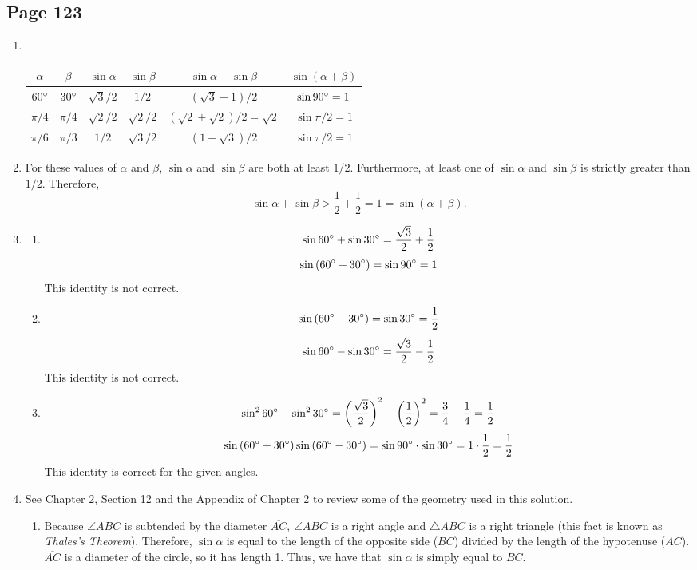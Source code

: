 \documentclass{article}
\newenvironment{solutions}[1]
{\subsection*{#1}
 \begin{enumerate}[leftmargin=1.5em]}
{\end{enumerate}}
\newcommand{\solution}{\item}
\newenvironment{subsolutions}
{\begin{enumerate}}
{\end{enumerate}}
\newcommand{\subsolution}{\item}
\begin{document}
\begin{solutions}{Page 123}
\solution ~ %
\begin{center}
\bgroup
\def\arraystretch{2.1}
\setlength\tabcolsep{15pt}
\begin{tabular}{ |c|c|c|c|c|c| }
\hline
$\alpha$
& $\beta$
& $\sin{\alpha}$
& $\sin{\beta}$
& $\sin{\alpha} + \sin{\beta}$
& $\sin\left(\alpha+\beta\right)$ \\
\hline
$60\degree$
& $30\degree$
& $\sqrt{3}/2$
& $1/2$
& $\left(\sqrt{3}+1\right)/2$
& $\sin{90\degree} = 1$\\
\hline
$\pi / 4$
& $\pi / 4$
& $\sqrt{2}/2$
& $\sqrt{2}/2$
& $\left(\sqrt{2}+\sqrt{2}\right)/2 = \sqrt{2}$
& $\sin{\pi/2} = 1$\\
\hline
$\pi / 6$
& $\pi / 3$
& $1/2$
& $\sqrt{3}/2$
& $\left(1+\sqrt{3}\right)/2$
& $\sin{\pi/2} = 1$\\
\hline
\end{tabular}
\egroup
\end{center}

\solution %
For these values of $\alpha$ and $\beta$, $\sin{\alpha}$ and $\sin{\beta}$ are both at least $1/2$. Furthermore, at least one of $\sin{\alpha}$ and $\sin{\beta}$ is strictly greater than $1/2$. Therefore,
\[
\sin{\alpha} + \sin{\beta} > \dfrac{1}{2} + \dfrac{1}{2} = 1 = \sin\left(\alpha+\beta\right).
\]
\solution %
\begin{subsolutions}

\subsolution %
\[
\sin{60\degree} + \sin{30\degree} = \dfrac{\sqrt{3}}{2} + \dfrac{1}{2}
\]
\[
\sin\left(60\degree + 30\degree\right) = \sin{90\degree} = 1
\]
This identity is not correct.
\subsolution %
\[
\sin\left(60\degree - 30\degree\right) = \sin{30\degree} = \dfrac{1}{2}
\]
\[
\sin{60\degree} - \sin{30\degree} = \dfrac{\sqrt{3}}{2} - \dfrac{1}{2}
\]
This identity is not correct.
\subsolution %
\[
\sin^{2}{60\degree} - \sin^2{30\degree} = \left(\dfrac{\sqrt{3}}{2}\right)^2 - \left(\dfrac{1}{2}\right)^2 = \dfrac{3}{4} - \dfrac{1}{4} = \dfrac{1}{2}
\]
\[
\sin\left(60\degree + 30\degree\right)\sin\left(60\degree - 30\degree\right) = \sin{90\degree} \cdot \sin{30\degree} = 1 \cdot \dfrac{1}{2} = \dfrac{1}{2}
\]
This identity is correct for the given angles.

\end{subsolutions}

\solution %
See Chapter 2, Section 12 and the Appendix of Chapter 2 to review some of the geometry used in this solution.
\begin{subsolutions}
\subsolution %
Because $\angle{ABC}$ is subtended by the diameter $\overline{AC}$, $\angle{ABC}$ is a right angle and $\triangle{ABC}$ is a right triangle (this fact is known as \textit{Thales's Theorem}). Therefore, $\sin{\alpha}$ is equal to the length of the opposite side ($BC$) divided by the length of the hypotenuse ($AC$). $\overline{AC}$ is a diameter of the circle, so it has length 1. Thus, we have that $\sin{\alpha}$ is simply equal to $BC$.


\end{subsolutions}
\end{solutions}
\end{document}
